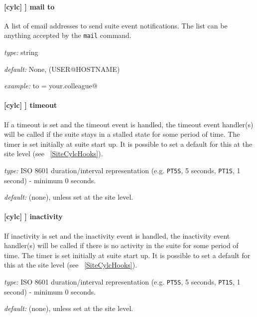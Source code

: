 \paragraph[mail to]{[cylc] \textrightarrow [[events]] \textrightarrow mail to}

A list of email addresses to send suite event notifications. The list can be
anything accepted by the \lstinline=mail= command.

\begin{myitemize}
    \item {\em type:} string
    \item {\em default:} None, (USER@HOSTNAME)
    \item {\em example:} \lstinline@mail to = your.colleague@
\end{myitemize}

\paragraph[timeout]{[cylc] \textrightarrow [[events]] \textrightarrow timeout}

If a timeout is set and the timeout event is handled, the timeout event
handler(s) will be called if the suite stays in a stalled state for some period
of time. The timer is set initially at suite start up. It is possible to set a
default for this at the site level (see ~\ref{SiteCylcHooks}).

\begin{myitemize}
    \item {\em type:} ISO 8601 duration/interval representation (e.g.
 \lstinline=PT5S=, 5 seconds, \lstinline=PT1S=, 1 second) - minimum 0 seconds.
    \item {\em default:} (none), unless set at the site level.
\end{myitemize}

\paragraph[inactivity]{[cylc] \textrightarrow [[events]] \textrightarrow inactivity}

If inactivity is set and the inactivity event is handled, the inactivity event
handler(s) will be called if there is no activity in the suite for some period
of time. The timer is set initially at suite start up. It is possible to set a
default for this at the site level (see ~\ref{SiteCylcHooks}).

\begin{myitemize}
    \item {\em type:} ISO 8601 duration/interval representation (e.g.
 \lstinline=PT5S=, 5 seconds, \lstinline=PT1S=, 1 second) - minimum 0 seconds.
    \item {\em default:} (none), unless set at the site level.
\end{myitemize}

